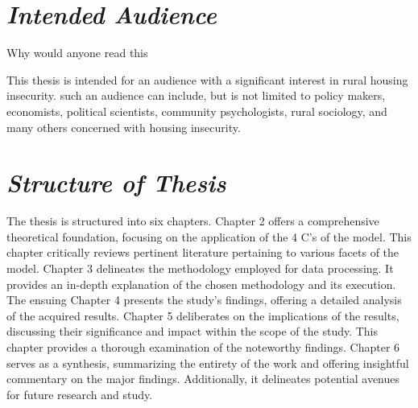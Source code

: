 \section{\textit{Intended Audience}}
Why would anyone read this 

This thesis is intended for an audience with a significant interest in rural housing insecurity. such an audience can include, but is not limited to policy makers, economists, political scientists, community psychologists, rural sociology, and many others concerned with housing insecurity. 

\section{\textit{Structure of Thesis}}
The thesis is structured into six chapters. Chapter 2 offers a comprehensive theoretical foundation, focusing on the application of the 4 C's of the \hs model. This chapter critically reviews pertinent literature pertaining to various facets of the model. Chapter 3 delineates the methodology employed for data processing. It provides an in-depth explanation of the chosen methodology and its execution. The ensuing Chapter 4 presents the study's findings, offering a detailed analysis of the acquired results. Chapter 5 deliberates on the implications of the results, discussing their significance and impact within the scope of the study. This chapter provides a thorough examination of the noteworthy findings. Chapter 6 serves as a synthesis, summarizing the entirety of the work and offering insightful commentary on the major findings. Additionally, it delineates potential avenues for future research and study.

\endinput